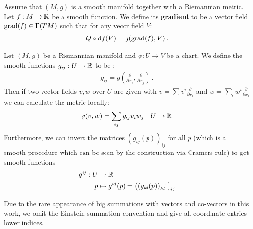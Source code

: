 \begin{definition}
	Assume that $(M,g)$ is a smooth manifold together with a Riemannian metric. Let $f:M\to \mathbb{R}$ be a smooth function. We define its \textbf{gradient} to be a vector field $\mathrm{grad}(f)\in \Gamma(TM)$ such that for any vecor field $V$:
	\begin{align*}
		Q\circ \mathop{}\!\mathrm{d} f (V) = g(\mathrm{grad}(f),V) \, .
	\end{align*}
\end{definition}

\begin{definition}\label{def: local description of gradient gij}
	Let $(M,g)$ be a Riemannian manifold and $\phi:U\to V$ be a chart. We define the smooth functions $g_{ij}:U\to \mathbb{R}$ to be :
	\begin{align*}
		g_{ij}=g(\frac{\partial}{\partial x_i},\frac{\partial}{\partial x_j}) \, .
	\end{align*}
	Then if two vector fields $v,w$ over $U$ are given with $v=\sum v^i \frac{\partial}{\partial x_i}$ and $w=\sum _i w^i \frac{\partial}{\partial x_i}$ we can calculate the metric locally:
	\begin{align*}
		g(v,w)=\sum_{ij}g_{ij} v_iw_j\, :U\to \mathbb{R}
	\end{align*} Furthermore, we can invert the matrices $(g_{ij}(p))_{ij}$ for all $p$ (which is a smooth procedure which can be seen by the construction via Cramers rule) to get smooth functions 
	\begin{align*}
		g^{ij}: U&\to \mathbb{R}\\
		p&\mapsto g^{ij}(p)= \left( (g_{kl}(p))_{kl}^{-1} \right)_{ij}
	\end{align*}
\end{definition}
\begin{remark}
	Due to the rare appearance of big summations with vectors and co-vectors in this work, we omit the Einstein summation convention and give all coordinate entries lower indices. 
\end{remark}

